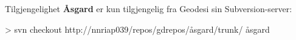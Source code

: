 \documentclass[12pt,table,t]{beamer}
\newcommand{\Asgard}[0]{\textbf{Åsgard} }
\begin{document}
\begin{frame}[fragile]{Tilgjengelighet}
  \Asgard er kun tilgjengelig fra Geodesi sin Subversion-server:

  \begin{lsttermcmd}
> svn checkout http://nnriap039/repos/gdrepos/åsgard/trunk/ åsgard
  \end{lsttermcmd}
\end{frame}
\end{document}
